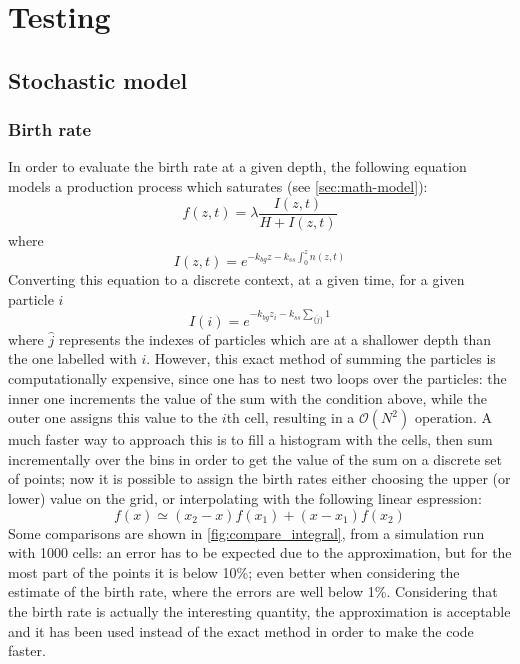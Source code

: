 \chapter{Testing}
\section{Stochastic model}
\subsection{Birth rate} \label{sec:model:birthrate}
In order to evaluate the birth rate at a given depth, the following equation models a production process which saturates (see \autoref{sec:math-model}):
\begin{equation}
  f(z,t) = \lambda \frac{I(z,t)}{H + I(z,t)}
\end{equation}
where
\[ I(z,t) = e^{-k_{bg}z-k_{ss}\int_0^z n(z,t)} \]
Converting this equation to a discrete context, at a given time, for a given particle $i$
\[ I(i) = e^{-k_{bg}z_i - k_{ss}\sum_{\{\hat{j}\}}1} \]
where $\hat{j}$ represents the indexes of particles which are at a shallower depth than the one labelled with $i$.
However, this exact method of summing the particles is computationally expensive, since one has to nest two loops over the particles: the inner one increments the value of the sum with the condition above, while the outer one assigns this value to the $i$th cell, resulting in a $\mathcal{O}(N^2)$ operation. A much faster way to approach this is to fill a histogram with the cells, then sum incrementally over the bins in order to get the value of the sum on a discrete set of points; now it is possible to assign the birth rates either choosing the upper (or lower) value on the grid, or interpolating with the following linear espression:
\[ f(x) \simeq (x_2-x)f(x_1)+(x-x_1)f(x_2) \]
Some comparisons are shown in \autoref{fig:compare_integral}, from a simulation run with 1000 cells: an error has to be expected due to the approximation, but for the most part of the points it is below 10\%; even better when considering the estimate of the birth rate, where the errors are well below 1\%. Considering that the birth rate is actually the interesting quantity, the approximation is acceptable and it has been used instead of the exact method in order to make the code faster.

